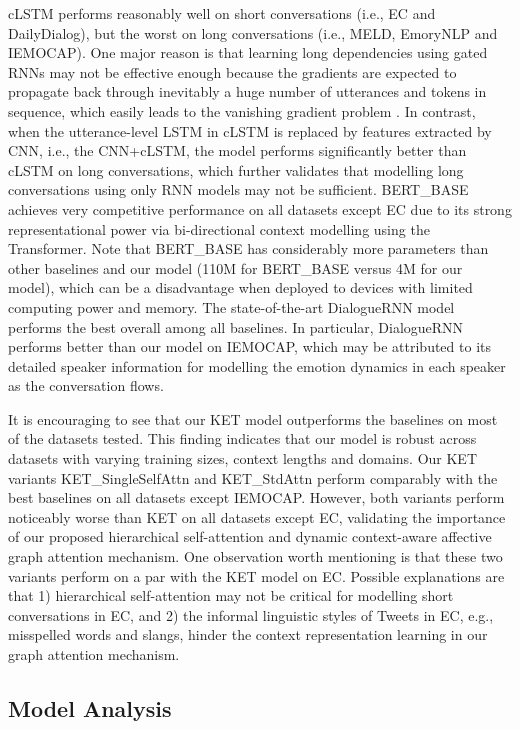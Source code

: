 \documentclass[11pt,a4paper]{article}
\begin{document}
cLSTM performs reasonably well on short conversations (i.e., EC and DailyDialog), but the worst on long conversations (i.e., MELD, EmoryNLP and IEMOCAP). One major reason is that learning long dependencies using gated RNNs may not be effective enough because the gradients are expected to propagate back through inevitably a huge number of utterances and tokens in sequence, which easily leads to the vanishing gradient problem \cite{bengio1994learning}. In contrast, when the utterance-level LSTM in cLSTM is replaced by features extracted by CNN, i.e., the CNN+cLSTM, the model performs significantly better than cLSTM on long conversations, which further validates that modelling long conversations using only RNN models may not be sufficient.
BERT\_BASE achieves very competitive performance on all datasets except EC due to its strong representational power via bi-directional context modelling using the Transformer. Note that BERT\_BASE has considerably more parameters than other baselines and our model (110M for BERT\_BASE versus 4M for our model), which can be a disadvantage when deployed to devices with limited computing power and memory.
The state-of-the-art DialogueRNN model performs the best overall among all baselines. In particular, DialogueRNN performs better than our model on IEMOCAP, which may be attributed to its detailed speaker information for modelling the emotion dynamics in each speaker as the conversation flows.


It is encouraging to see that our KET model outperforms the baselines on most of the datasets tested. This finding indicates that our model is robust across datasets with varying training sizes, context lengths and domains. 
Our KET variants KET\_SingleSelfAttn and KET\_StdAttn perform comparably with the best baselines on all datasets except IEMOCAP. However, both variants perform noticeably worse than KET on all datasets except EC, validating the importance of our proposed hierarchical self-attention and dynamic context-aware affective graph attention mechanism. One observation worth mentioning is that these two variants perform on a par with the KET model on EC. Possible explanations are that 1) hierarchical self-attention may not be critical for modelling short conversations in EC, and 2) the informal linguistic styles of Tweets in EC, e.g., misspelled words and slangs, hinder the context representation learning in our graph attention mechanism.

\subsection{Model Analysis}
\label{sec: model analysis}
\end{document}
